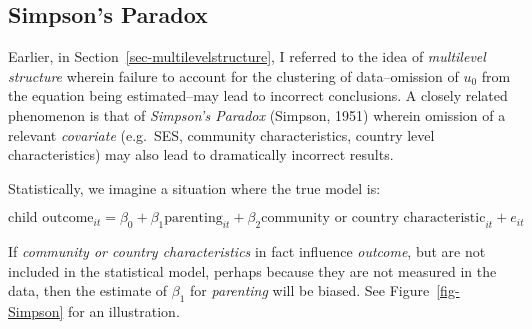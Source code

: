 \documentclass[
  letterpaper,
  DIV=11,
  numbers=noendperiod]{scrreprt}
\newenvironment{Shaded}{\begin{snugshade}}{\end{snugshade}}
\newcommand{\FunctionTok}[1]{\textcolor[rgb]{0.28,0.35,0.67}{#1}}
\newcommand{\NormalTok}[1]{\textcolor[rgb]{0.00,0.23,0.31}{#1}}
\newcommand{\OtherTok}[1]{\textcolor[rgb]{0.00,0.23,0.31}{#1}}
\newcommand{\SpecialCharTok}[1]{\textcolor[rgb]{0.37,0.37,0.37}{#1}}
\newcommand{\StringTok}[1]{\textcolor[rgb]{0.13,0.47,0.30}{#1}}
\begin{document}
\hypertarget{simpsons-paradox}{%
\subsection{Simpson's Paradox}\label{simpsons-paradox}}

Earlier, in Section~\ref{sec-multilevelstructure}, I referred to the
idea of \emph{multilevel structure} wherein failure to account for the
clustering of data--omission of \(u_0\) from the equation being
estimated--may lead to incorrect conclusions. A closely related
phenomenon is that of \emph{Simpson's Paradox} (Simpson, 1951) wherein
omission of a relevant \emph{covariate} (e.g.~SES, community
characteristics, country level characteristics) may also lead to
dramatically incorrect results.

Statistically, we imagine a situation where the true model is:

\[\text{child outcome}_{it} = \beta_0 + \beta_1 \text{parenting}_{it} + \beta_2 \text{community or country characteristic}_{it} + e_{it}\]

If \emph{community or country characteristics} in fact influence
\emph{outcome}, but are not included in the statistical model, perhaps
because they are not measured in the data, then the estimate of
\(\beta_1\) for \emph{parenting} will be biased. See
Figure~\ref{fig-Simpson} for an illustration.

\begin{Shaded}
\end{Shaded}
\end{document}

